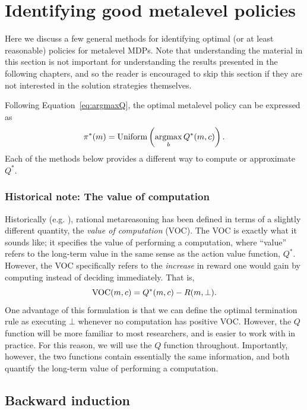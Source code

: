 \section{Identifying good metalevel policies}\label{sec:computing}

Here we discuss a few general methods for identifying optimal (or at least reasonable) policies for metalevel MDPs. Note that understanding the material in this section is not important for understanding the results presented in the following chapters, and so the reader is encouraged to skip this section if they are not interested in the solution strategies themselves.

Following Equation~\ref{eq:argmaxQ}, the optimal metalevel policy can be expressed as
%
\begin{equation}
  \pi^*(m) = \mathrm{Uniform}\left(\operatorname*{argmax}_b Q^*(m, c)\right).
\end{equation}
Each of the methods below provides a different way to compute or approximate $Q^*$.

\subsubsection{Historical note: The value of computation}

Historically (e.g. \citealp{russell1991principles}), rational metareasoning has been defined in terms of a slightly different quantity, the \emph{value of computation} (VOC). The VOC is exactly what it sounds like; it specifies the value of performing a computation, where ``value'' refers to the long-term value in the same sense as the action value function, $Q^*$. However, the VOC specifically refers to the \emph{increase} in reward one would gain by computing instead of deciding immediately. That is,
\begin{equation}
  \text{VOC}(m, c) = Q^*(m, c) - R(m, \bot).
\end{equation}
One advantage of this formulation is that we can define the optimal termination rule as executing $\bot$ whenever no computation has positive VOC. However, the $Q$ function will be more familiar to most researchers, and is easier to work with in practice. For this reason, we will use the $Q$ function throughout. Importantly, however, the two functions contain essentially the same information, and both quantify the long-term value of performing a computation.

\subsection{Backward induction}\label{sec:backinduct}

